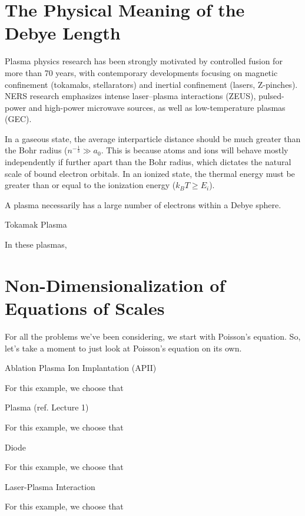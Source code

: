 \section{The Physical Meaning of the Debye Length}

Plasma physics research has been strongly motivated by controlled fusion for more than 70 years, with contemporary developments focusing on magnetic confinement (tokamaks, stellarators) and inertial confinement (lasers, Z-pinches). NERS research emphasizes intense laser–plasma interactions (ZEUS), pulsed-power and high-power microwave sources, as well as low-temperature plasmas (GEC).


In a gaseous state, the average interparticle distance should be much greater than the Bohr radius ($n^{-\frac{1}{3}} \gg a_0$. This is because atoms and ions will behave mostly independently if further apart than the Bohr radius, which dictates the natural scale of bound electron orbitals. In an ionized state, the thermal energy must be greater than or equal to the ionization energy ($k_BT \geq E_i$).

\begin{prop}
  A plasma necessarily has a large number of electrons within a Debye sphere.
\end{prop}

\begin{eg}
  Tokamak Plasma
\end{eg}
\begin{explanation}
  In these plasmas, 
\end{explanation}


\section{Non-Dimensionalization of Equations of Scales}
For all the problems we've been considering, we start with Poisson's equation. So, let's take a moment to just look at Poisson's equation on its own.

\begin{eg}
  Ablation Plasma Ion Implantation (APII)
\end{eg}
\begin{explanation}
  For this example, we choose that
\end{explanation}

\begin{eg}
  Plasma (ref. Lecture 1)
\end{eg}
\begin{explanation}
  For this example, we choose that
\end{explanation}

\begin{eg}
  Diode
\end{eg}
\begin{explanation}
  For this example, we choose that
\end{explanation}

\begin{eg}
  Laser-Plasma Interaction
\end{eg}
\begin{explanation}
  For this example, we choose that
\end{explanation}
